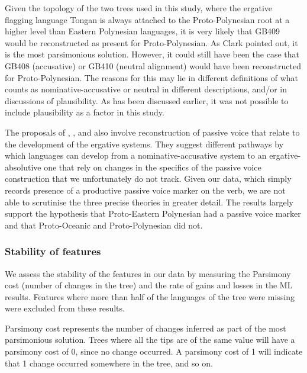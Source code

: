 \documentclass[draft,10pt]{article} %
\begin{document}
Given the topology of the two trees used in this study, where the ergative flagging language Tongan is always attached to the Proto-Polynesian root at a higher level than Eastern Polynesian languages, it is very likely that GB409 would be reconstructed as present for Proto-Polynesian. As Clark pointed out, it is the most parsimonious solution. However, it could still have been the case that GB408 (accusative) or GB410 (neutral alignment) would have been reconstructed for Proto-Polynesian. The reasons for this may lie in different definitions of what counts as nominative-accusative or neutral in different descriptions, and/or in discussions of plausibility. As has been discussed earlier, it was not possible to include plausibility as a factor in this study.

The proposals of \citet{hale_1968}, \citet{hohepa_1967, hohepa_1969}, and \citet{chung1978} also involve reconstruction of passive voice that relate to the development of the ergative systems. They suggest different pathways by which languages can develop from a nominative-accusative system to an ergative-absolutive one that rely on changes in the specifics of the passive voice construction that we unfortunately do not track. Given our data, which simply records presence of a productive passive voice marker on the verb, we are not able to scrutinise the three precise theories in greater detail. The results largely support the hypothesis that Proto-Eastern Polynesian had a passive voice marker and that Proto-Oceanic and Proto-Polynesian did not. %





\subsubsection{Stability of features}
\label{sec:asr:stability}

We assess the stability of the features in our data by measuring the Parsimony cost (number of changes in the tree) and the rate of gains and losses in the ML results. Features where more than half of the languages of the tree were missing were excluded from these results.

Parsimony cost represents the number of changes inferred as part of the most parsimonious solution. Trees where all the tips are of the same value will have a parsimony cost of 0, since no change occurred. A parsimony cost of 1 will indicate that 1 change occurred somewhere in the tree, and so on.
\end{document}
